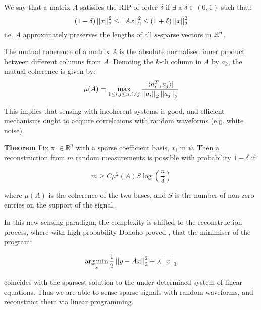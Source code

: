 \begin{definition}[RIP]
We say that a matrix \(A\) satisifes the RIP of order \(\delta\) if \(\exists\) a \(\delta \in \left(0, 1\right)\) such that:
\begin{equation}
\left(1 - \delta\right) \left|\left|x\right|\right|_2^2 \leq \left|\left|Ax\right|\right|_2^2 \leq \left(1 + \delta\right) \left|\left|x\right|\right|_2^2
\end{equation}
i.e. \(A\) approximately preserves the lengths of all \(s\)-sparse vectors in \({\mathbb{R}}^n\). 
\end{definition}

\begin{definition}[Coherence]
The mutual coherence of a matrix \(A\) is the absolute normalised inner product between different columns from \(A\). Denoting the \(k\)-th column in \(A\) by \(a_k\), the mutual coherence is given by:
\begin{equation}
\mu(A) = \max_{1\leq i,j\leq n , i\neq j} \frac{|\langle a^T_i, a_j\rangle|}{\left|\left|a_i\right|\right|_2\left|\left|a_j\right|\right|_2}
\end{equation}
\end{definition}

This implies that sensing with incoherent systems is good, and efficient mechanisms ought to acquire correlations with random waveforms (e.g. white noise).

\textbf{Theorem} \cite{Candes2006}
Fix x \(\in \mathbb{R}^n\) with a sparse coefficient basis, \(x_{i}\) in \(\psi\). Then a reconstruction from \(m\) random measurements is possible with probability \(1 - \delta\) if: 

\begin{equation}
m \geq C \mu^2(A) S \log\left(\frac{n}{\delta}\right)
\end{equation}
\label{minsamples}

where \( \mu(A)\) is the coherence of the two bases, and \(S\) is the number of non-zero entries on the support of the signal. 

In this new sensing paradigm, the complexity is shifted to the reconstruction process, where with high probability Donoho proved \cite{donoho2004neighborly}, that the minimiser of the program:

\begin{equation}
\operatorname*{arg\,min}_{x} \frac{1}{2}\left|\left|y-Ax\right|\right|_2^2 + \lambda\left|\left|x\right|\right|_1
\end{equation}

coincides with the sparsest solution to the under-determined system of linear equations. Thus we are able to sense sparse signals with random waveforms, and reconstruct them via linear programming.

